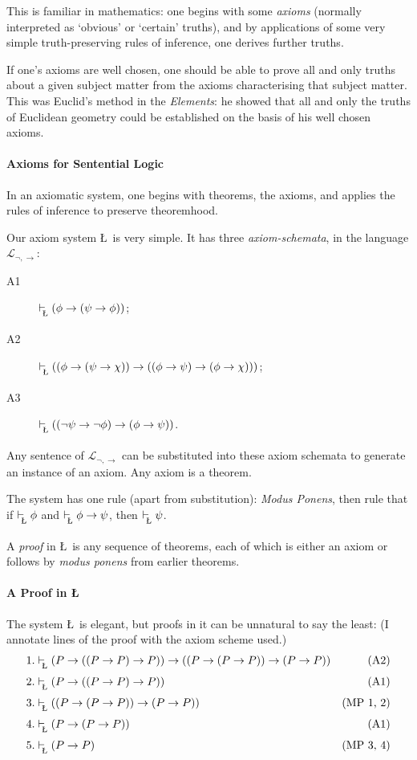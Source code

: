 {This is familiar in mathematics: one begins with some \emph{axioms} (normally interpreted as `obvious' or `certain' truths), and by applications of some very simple truth-preserving rules of inference, one derives further truths.

If one's axioms are well chosen, one should be able to prove all and only truths about a given subject matter from the axioms characterising that subject matter. This was Euclid's method in the \emph{Elements}: he showed that all and only the truths of Euclidean geometry could be established on the basis of his well chosen axioms.

\paragraph{Axioms for Sentential Logic}

In an axiomatic system, one begins with theorems, the axioms, and applies the rules of inference to preserve theoremhood. 

Our axiom system \L\ is very simple. It has three \emph{axiom-schemata}, in the language $\mathcal{L}_{\neg,\to}$:
\begin{description}
	\item [A1] $\lvdash (\phi \to (\psi \to \phi))$;
	\item [A2]$\lvdash ((\phi \to (\psi \to \chi)) \to ((\phi \to \psi) \to (\phi \to \chi)))$;
	\item [A3] $\lvdash ((\neg \psi \to \neg \phi) \to (\phi \to \psi))$.
\end{description}
Any sentence of $\mathcal{L}_{\neg,\to}$ can be substituted into these axiom schemata to generate an instance of an axiom. Any axiom is a theorem.

The system has one rule (apart from substitution): \emph{\emph{Modus Ponens}}, then rule that if $\lvdash \phi$ and $\lvdash \phi\to\psi$, then $\lvdash\psi$. 

A \emph{proof} in \L\ is any sequence of theorems, each of which is either an axiom or follows by \emph{modus ponens} from earlier theorems.

\paragraph{A Proof in \L}

The system \L\ is  elegant, but proofs in it can be unnatural to say the least: (I annotate lines of the proof with the axiom scheme used.)
\begin{align*}
 1. &\lvdash (P\to((P\to P)\to P)) \to ((P\to(P\to P))\to(P\to P)) & \text{(A2)}\\
2. &\lvdash (P\to((P\to P)\to P)) &\text{(A1)}\\
3. &\lvdash ((P\to(P\to P))\to(P\to P)) &\text{(MP 1, 2)}\\
4. &\lvdash (P \to (P\to P)) & \text{(A1)}\\
5. &\lvdash (P\to P)&\text{(MP 3, 4)}
\end{align*} 

}
